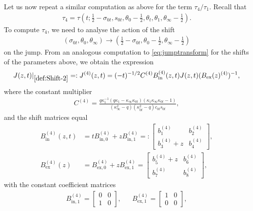 \documentclass[a4paper,reqno,11pt]{amsart}
\numberwithin{equation}{section}
\numberwithin{figure}{section}
\theoremstyle{plain}
\theoremstyle{remark}
\numberwithin{rhp}{section}
\begin{document}
Let us now repeat a similar computation as above for the term $\tau_4/\tau_1$.
Recall that 
\begin{align}
    \tau_4 =  \tau(t; \frac{1}{2}-\sigma_{0t}, s_{0t}, \theta_0-\frac{1}{2}, \theta_t, \theta_{1}, \theta_{\infty}-\frac{1}{2}).
\end{align}
To compute $\tau_4$, we need to analyse the action of the shift 
\begin{align}\label{def:Shift-2}
  \left(\sigma_{0t}, \theta_{0}, \theta_{\infty}\right) \to \left(\frac{1}{2}-\sigma_{0t}, \theta_0-\frac{1}{2}, \theta_{\infty}-\frac{1}{2} \right)
\end{align}
on the jump. From an analogous computation to \eqref{eq:jumptransform} for the shifts of the parameters above, we obtain the expression
\begin{align}
   J(z,t)\vert_{\eqref{def:Shift-2}}=: J^{(4)}(z,t) = (-t)^{-1/2} C^{(4)}  B_{\text{in}}^{(4)}(z,t) J(z,t) (B_{\text{ex}}(z)^{(4)})^{-1},
\end{align}
where the constant multiplier
\begin{align}
    C^{(4)} 
    =\frac{q \kappa_1^{-1} \left(q\kappa_1-\kappa_{\infty}\kappa_{0t}\right) \left(\kappa_1\kappa_{\infty} \kappa_{0t}-1\right)}{\left(\kappa_{\infty}^2-q\right) \left(\kappa_{0t}^2-q\right) c_{0t} s_{0t}},
\end{align}
and the shift matrices equal
\begin{equation}\label{Bin-out-2}
\begin{split}
    B^{(4)}_{\text{in}}(z,t) &= t B^{(4)}_{\text{in}, 0} + z B^{(4)}_{\text{in},1}=: \begin{bmatrix}
       b^{(4)}_1  & b_2^{(4)} \\
        b_3^{(4)}+z & b_4^{(4)} 
    \end{bmatrix},\\
    B^{(4)}_{\text{ex}}(z) &= B^{(4)}_{\text{ex},0} + z B^{(4)}_{\text{ex},1}= \begin{bmatrix}
       b_5^{(4)}+ z  & b_6^{(4)} \\
        b_7^{(4)} & b_8^{(4)} 
    \end{bmatrix},
\end{split}
\end{equation}
with the constant coefficient matrices
\begin{align}
   B^{(4)}_{\text{in},1} = \begin{bmatrix}
       0  & 0 \\
        1 & 0
    \end{bmatrix}, &&  B^{(4)}_{\text{ex},1} = \begin{bmatrix}
       1  & 0 \\
        0 & 0
    \end{bmatrix},
\end{align}
\end{document}
